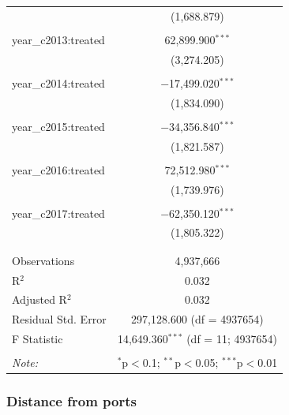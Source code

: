 \documentclass[11pt,english]{article}
\begin{document}
\begin{table}[!htbp]
\begin{tabular}{@{\extracolsep{5pt}}lc}
  & (1,688.879) \\ 
  & \\ 
 year\_c2013:treated & 62,899.900$^{***}$ \\ 
  & (3,274.205) \\ 
  & \\ 
 year\_c2014:treated & $-$17,499.020$^{***}$ \\ 
  & (1,834.090) \\ 
  & \\ 
 year\_c2015:treated & $-$34,356.840$^{***}$ \\ 
  & (1,821.587) \\ 
  & \\ 
 year\_c2016:treated & 72,512.980$^{***}$ \\ 
  & (1,739.976) \\ 
  & \\ 
 year\_c2017:treated & $-$62,350.120$^{***}$ \\ 
  & (1,805.322) \\ 
  & \\ 
\hline \\[-1.8ex] 
Observations & 4,937,666 \\ 
R$^{2}$ & 0.032 \\ 
Adjusted R$^{2}$ & 0.032 \\ 
Residual Std. Error & 297,128.600 (df = 4937654) \\ 
F Statistic & 14,649.360$^{***}$ (df = 11; 4937654) \\ 
\hline 
\hline \\[-1.8ex] 
\textit{Note:}  & \multicolumn{1}{r}{$^{*}$p$<$0.1; $^{**}$p$<$0.05; $^{***}$p$<$0.01} \\ 
\end{tabular} 
\end{table}

\clearpage

\hypertarget{distance-from-ports}{%
\subsubsection{Distance from ports}\label{distance-from-ports}}
\end{document}
